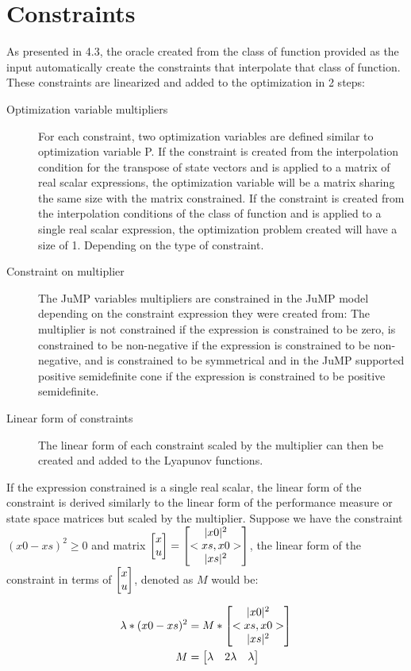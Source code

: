 \section{Constraints}
As presented in 4.3, the oracle created from the class of function provided as the input automatically create the constraints that interpolate that class of function. These constraints are linearized and added to the optimization in 2 steps:
\begin{description}
    \item [Optimization variable multipliers] For each constraint, two optimization variables are defined similar to optimization variable P. If the constraint is created from the interpolation condition for the transpose of state vectors and is applied to a matrix of real scalar expressions, the optimization variable will be a matrix sharing the same size with the matrix constrained. If the constraint is created from the interpolation conditions of the class of function and is applied to a single real scalar expression, the optimization problem created will have a size of 1. Depending on the type of constraint.
    \item [Constraint on multiplier] The JuMP variables multipliers are constrained in the JuMP model depending on the constraint expression they were created from: The multiplier is not constrained if the expression is constrained to be zero, is constrained to be non-negative if the expression is constrained to be non-negative, and is constrained to be symmetrical and in the JuMP supported positive semidefinite cone if the expression is constrained to be positive semidefinite.
    \item [Linear form of constraints] The linear form of each constraint scaled by the multiplier can then be created and added to the Lyapunov functions.
\end{description}

If the expression constrained is a single real scalar, the linear form of the constraint is derived similarly to the linear form of the performance measure or state space matrices but scaled by the multiplier. Suppose we have the constraint $(x0 - xs)^2 \geq 0$ and matrix $\begin{bmatrix}x\\ u\end{bmatrix} = \begin{bmatrix}|x0|^2\\ <xs, x0>\\ |xs|^2\end{bmatrix}$, the linear form of the constraint in terms of $\begin{bmatrix}x\\ u\end{bmatrix}$, denoted as $M$ would be:

\begin{subequations} \label{eqn:constraint_single}
	\begin{align}
    \lambda * (x0 - xs)^2 &= M * \begin{bmatrix}|x0|^2\\ <xs, x0>\\ |xs|^2\end{bmatrix} \label{eq_cons_single1}       \\
	M &= \begin{bmatrix}\lambda& 2\lambda & \lambda\end{bmatrix} \label{eq_cons_single2}
	\end{align}
\end{subequations}

